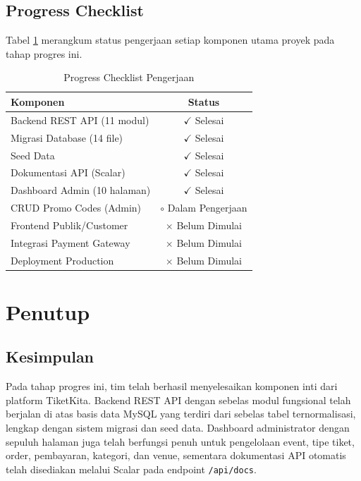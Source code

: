 \documentclass[12pt,a4paper]{report}
\begin{document}
\section{Progress Checklist}
Tabel \ref{tab:progress-checklist} merangkum status pengerjaan setiap komponen utama proyek pada tahap progres ini.

\begin{table}[h]
\centering
\caption{Progress Checklist Pengerjaan}
\label{tab:progress-checklist}
\begin{tabular}{lc}
\toprule
\textbf{Komponen} & \textbf{Status} \\
\midrule
Backend REST API (11 modul)        & $\checkmark$ Selesai \\
Migrasi Database (14 file)         & $\checkmark$ Selesai \\
Seed Data                          & $\checkmark$ Selesai \\
Dokumentasi API (Scalar)           & $\checkmark$ Selesai \\
Dashboard Admin (10 halaman)       & $\checkmark$ Selesai \\
CRUD Promo Codes (Admin)           & $\circ$ Dalam Pengerjaan \\
Frontend Publik/Customer           & $\times$ Belum Dimulai \\
Integrasi Payment Gateway          & $\times$ Belum Dimulai \\
Deployment Production              & $\times$ Belum Dimulai \\
\bottomrule
\end{tabular}
\end{table}

\chapter{Penutup}

\section{Kesimpulan}
Pada tahap progres ini, tim telah berhasil menyelesaikan komponen inti dari platform TiketKita. Backend REST API dengan sebelas modul fungsional telah berjalan di atas basis data MySQL yang terdiri dari sebelas tabel ternormalisasi, lengkap dengan sistem migrasi dan seed data. Dashboard administrator dengan sepuluh halaman juga telah berfungsi penuh untuk pengelolaan event, tipe tiket, order, pembayaran, kategori, dan venue, sementara dokumentasi API otomatis telah disediakan melalui Scalar pada endpoint \texttt{/api/docs}.
\end{document}

